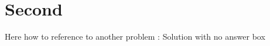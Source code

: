 \chapter{Second}


\begin{problem}
{
Here how to reference to another problem : 
}
{
Solution with no answer box
}
{}
\end{problem}